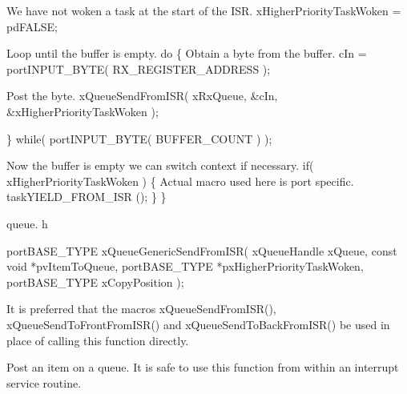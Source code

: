 \begin{DoxyPre}We have not woken a task at the start of the ISR.
        xHigherPriorityTaskWoken = pdFALSE;\end{DoxyPre}



\begin{DoxyPre}Loop until the buffer is empty.
        do
        \{
Obtain a byte from the buffer.
                cIn = portINPUT\_BYTE( RX\_REGISTER\_ADDRESS );\end{DoxyPre}



\begin{DoxyPre}Post the byte.
                xQueueSendFromISR( xRxQueue, &cIn, &xHigherPriorityTaskWoken );\end{DoxyPre}



\begin{DoxyPre}        \} while( portINPUT\_BYTE( BUFFER\_COUNT ) );\end{DoxyPre}



\begin{DoxyPre}Now the buffer is empty we can switch context if necessary.
        if( xHigherPriorityTaskWoken )
        \{
Actual macro used here is port specific.
                taskYIELD\_FROM\_ISR ();
        \}
 \}
 \end{DoxyPre}


queue. h 
\begin{DoxyPre}
 portBASE\_TYPE xQueueGenericSendFromISR(
                                                                                   xQueueHandle         xQueue,
                                                                                   const        void    *pvItemToQueue,
                                                                                   portBASE\_TYPE        *pxHigherPriorityTaskWoken,
                                                                                   portBASE\_TYPE        xCopyPosition
                                                                           );
 \end{DoxyPre}


It is preferred that the macros x\-Queue\-Send\-From\-I\-S\-R(), x\-Queue\-Send\-To\-Front\-From\-I\-S\-R() and x\-Queue\-Send\-To\-Back\-From\-I\-S\-R() be used in place of calling this function directly.

Post an item on a queue. It is safe to use this function from within an interrupt service routine.

